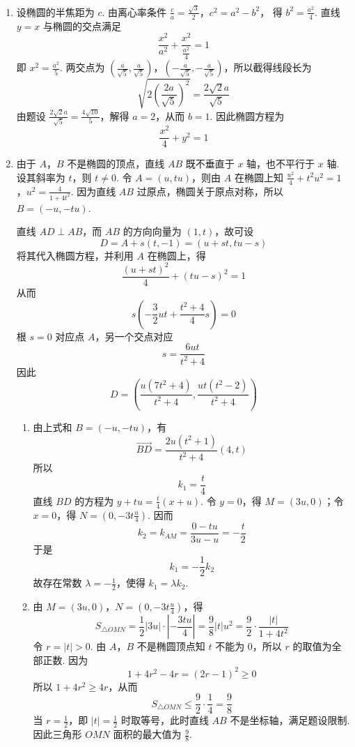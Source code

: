 \begin{solution}
\begin{enumerate}
\item 设椭圆的半焦距为 \(c\). 由离心率条件
\(\frac{c}{a}=\frac{\sqrt3}{2}\)，\(c^{2}=a^{2}-b^{2}\)，
得 \(b^{2}=\frac{a^{2}}{4}\). 直线 \(y=x\) 与椭圆的交点满足
\[
\frac{x^{2}}{a^{2}}+\frac{x^{2}}{\frac{a^{2}}{4}}=1
\]
即 \(x^{2}=\frac{a^{2}}{5}\). 两交点为 \((\frac{a}{\sqrt5},\frac{a}{\sqrt5})\)，\((-\frac{a}{\sqrt5},-\frac{a}{\sqrt5})\)，所以截得线段长为
\[
\sqrt{2\left(\frac{2a}{\sqrt5}\right)^{2}}=\frac{2\sqrt2a}{\sqrt5}
\]
由题设 \(\frac{2\sqrt2a}{\sqrt5}=\frac{4\sqrt{10}}5\)，解得 \(a=2\)，从而 \(b=1\). 因此椭圆方程为
\[
\frac{x^{2}}4+y^{2}=1
\]

\item 由于 \(A\)，\(B\) 不是椭圆的顶点，直线 \(AB\) 既不垂直于 \(x\) 轴，也不平行于 \(x\) 轴. 设其斜率为 \(t\)，则 \(t\neq0\). 令 \(A=(u,tu)\)，则由 \(A\) 在椭圆上知
\(\frac{u^{2}}4+t^{2}u^{2}=1\)，\(u^{2}=\frac4{1+4t^{2}}\).
因为直线 \(AB\) 过原点，椭圆关于原点对称，所以 \(B=(-u,-tu)\).

直线 \(AD\perp AB\)，而 \(AB\) 的方向向量为 \((1,t)\)，故可设
\[
D=A+s(t,-1)=(u+st,tu-s)
\]
将其代入椭圆方程，并利用 \(A\) 在椭圆上，得
\[
\frac{(u+st)^{2}}4+(tu-s)^{2}=1
\]
从而
\[
s\left(-\frac32ut+\frac{t^{2}+4}{4}s\right)=0
\]
根 \(s=0\) 对应点 \(A\)，另一个交点对应
\[
s=\frac{6ut}{t^{2}+4}
\]
因此
\[
D=\left(\frac{u(7t^{2}+4)}{t^{2}+4},\frac{ut(t^{2}-2)}{t^{2}+4}\right)
\]

\begin{enumerate}
\item 由上式和 \(B=(-u,-tu)\)，有
\[
\overrightarrow{BD}=\frac{2u(t^{2}+1)}{t^{2}+4}(4,t)
\]
所以
\[
k_{1}=\frac{t}{4}
\]
直线 \(BD\) 的方程为 \(y+tu=\frac{t}{4}(x+u)\). 令 \(y=0\)，得 \(M=(3u,0)\)；令 \(x=0\)，得 \(N=(0,-3t\frac{u}{4})\). 因而
\[
k_{2}=k_{AM}=\frac{0-tu}{3u-u}=-\frac{t}{2}
\]
于是
\[
k_{1}=-\frac12k_{2}
\]
故存在常数 \(\lambda=-\frac12\)，使得 \(k_{1}=\lambda k_{2}\).

\item 由 \(M=(3u,0)\)，\(N=(0,-3t\frac{u}{4})\)，得
\[
S_{\triangle OMN}=\frac12\lvert3u\rvert\cdot\left\lvert-\frac{3tu}{4}\right\rvert
=\frac98\lvert t\rvert u^{2}=\frac92\cdot\frac{\lvert t\rvert}{1+4t^{2}}
\]
令 \(r=\lvert t\rvert>0\). 由 \(A\)，\(B\) 不是椭圆顶点知 \(t\) 不能为 \(0\)，所以 \(r\) 的取值为全部正数. 因为
\[
1+4r^{2}-4r=(2r-1)^{2}\geqslant0
\]
所以 \(1+4r^{2}\geqslant4r\)，从而
\[
S_{\triangle OMN}\leqslant\frac92\cdot\frac14=\frac98
\]
当 \(r=\frac12\)，即 \(\lvert t\rvert=\frac12\) 时取等号，此时直线 \(AB\) 不是坐标轴，满足题设限制. 因此三角形 \(OMN\) 面积的最大值为 \(\frac98\).
\end{enumerate}
\end{enumerate}
\end{solution}
